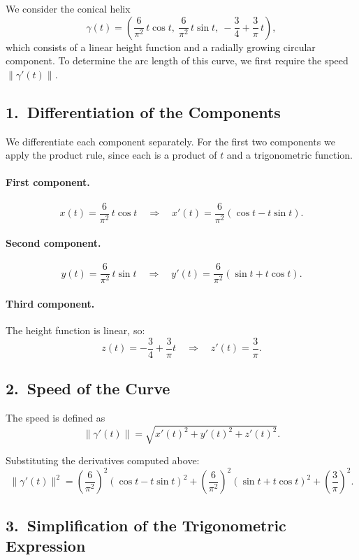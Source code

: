 We consider the conical helix
\[
\gamma(t)
= \left(
\frac{6}{\pi^{2}}\,t\cos t,\ 
\frac{6}{\pi^{2}}\,t\sin t,\ 
-\frac{3}{4}+\frac{3}{\pi}\,t
\right),
\]
which consists of a linear height function and a radially growing circular
component. To determine the arc length of this curve, we first require the
speed $\|\gamma'(t)\|$.

\subsection*{1.\ Differentiation of the Components}

We differentiate each component separately. For the first two components we
apply the product rule, since each is a product of $t$ and a trigonometric
function.

\paragraph{First component.}
\[
x(t)=\frac{6}{\pi^{2}}\,t\cos t
\quad\Rightarrow\quad
x'(t)=\frac{6}{\pi^{2}}(\cos t - t\sin t).
\]

\paragraph{Second component.}
\[
y(t)=\frac{6}{\pi^{2}}\,t\sin t
\quad\Rightarrow\quad
y'(t)=\frac{6}{\pi^{2}}(\sin t + t\cos t).
\]

\paragraph{Third component.}
The height function is linear, so:
\[
z(t)=-\frac{3}{4}+\frac{3}{\pi}t
\quad\Rightarrow\quad
z'(t)=\frac{3}{\pi}.
\]

\subsection*{2.\ Speed of the Curve}

The speed is defined as
\[
\|\gamma'(t)\|=\sqrt{x'(t)^2 + y'(t)^2 + z'(t)^2}.
\]

Substituting the derivatives computed above:
\[
\|\gamma'(t)\|^{2}
=
\left(\frac{6}{\pi^{2}}\right)^{2}(\cos t - t\sin t)^{2}
+
\left(\frac{6}{\pi^{2}}\right)^{2}(\sin t + t\cos t)^{2}
+
\left(\frac{3}{\pi}\right)^{2}.
\]

\subsection*{3.\ Simplification of the Trigonometric Expression}

